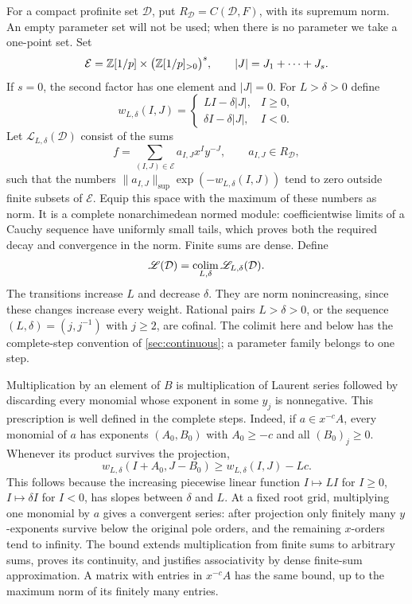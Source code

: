 For a compact profinite set $\mathcal D$, put
$R_{\mathcal D}=C(\mathcal D,F)$, with its supremum norm.  An empty
parameter set will not be used; when there is no parameter we take a
one-point set.  Set
\[
 \mathcal E=\mathbb Z[1/p]\times\bigl(\mathbb Z[1/p]_{>0}\bigr)^s,
 \qquad |J|=J_1+\cdots+J_s.
\]
If $s=0$, the second factor has one element and $|J|=0$.
For $L>\delta>0$ define
\begin{equation}\label{eq:laurent-weight}
 w_{L,\delta}(I,J)=
 \begin{cases}
 LI-\delta|J|,&I\geq0,\\
 \delta I-\delta|J|,&I<0.
 \end{cases}
\end{equation}
Let $\mathscr L_{L,\delta}(\mathcal D)$ consist of the sums
\[
 f=\sum_{(I,J)\in\mathcal E}a_{I,J}x^Iy^{-J},
 \qquad a_{I,J}\in R_{\mathcal D},
\]
such that the numbers
$\|a_{I,J}\|_{\sup}\exp(-w_{L,\delta}(I,J))$ tend to zero outside
finite subsets of $\mathcal E$.  Equip this space with the maximum of
these numbers as norm.  It is a complete nonarchimedean normed module:
coefficientwise limits of a Cauchy sequence have uniformly small tails,
which proves both the required decay and convergence in the norm.
Finite sums are dense.  Define
\[
 \mathscr L(\mathcal D)=\operatorname*{colim}_{L,\delta}
       \mathscr L_{L,\delta}(\mathcal D).
\]
The transitions increase $L$ and decrease $\delta$.  They are norm
nonincreasing, since these changes increase every weight.  Rational pairs
$L>\delta>0$, or the sequence $(L,\delta)=(j,j^{-1})$ with $j\geq2$,
are cofinal.  The colimit here and below has the complete-step convention
of \cref{sec:continuous}; a parameter family belongs to one step.

Multiplication by an element of $B$ is multiplication of Laurent series
followed by discarding every monomial whose exponent in some $y_j$ is
nonnegative.  This prescription is well defined in the complete steps.
Indeed, if $a\in x^{-c}A$, every monomial of $a$ has exponents
$(A_0,B_0)$ with $A_0\geq-c$ and all $(B_0)_j\geq0$.  Whenever its
product survives the projection,
\begin{equation}\label{eq:laurent-matrix-bound}
 w_{L,\delta}(I+A_0,J-B_0)
       \geq w_{L,\delta}(I,J)-Lc.
\end{equation}
This follows because the increasing piecewise linear function
$I\mapsto LI$ for $I\geq0$, $I\mapsto\delta I$ for $I<0$, has slopes
between $\delta$ and $L$.  At a fixed root grid, multiplying one
monomial by $a$ gives a convergent series: after projection only finitely
many $y$-exponents survive below the original pole orders, and the
remaining $x$-orders tend to infinity.  The bound extends multiplication
from finite sums to arbitrary sums, proves its continuity, and justifies
associativity by dense finite-sum approximation.  A matrix with entries
in $x^{-c}A$ has the same bound, up to the maximum norm of its finitely
many entries.

